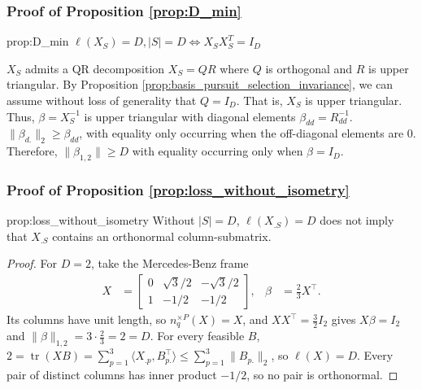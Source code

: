 \subsubsection{Proof of Proposition \ref{prop:D_min}}

\begin{restatedproposition}{prop:D_min}
$\ell (X_S) = D , |S| = D \Leftrightarrow X_S X_S^T = I_D$
\end{restatedproposition}

$X_S$ admits a QR decomposition $X_S = QR$ where $Q$ is orthogonal and $R$ is upper triangular.
By Proposition \ref{prop:basis_pursuit_selection_invariance}, we can assume without loss of generality that $Q = I_D$.
That is, $X_S$ is upper triangular.
Thus, $\beta = X_S^{-1}$ is upper triangular with diagonal elements $\beta_{dd} = R_{dd}^{-1}$.
$\|\beta_{d.}\|_2 \geq \beta_{dd}$, with equality only occurring when the off-diagonal elements are $0$.
Therefore, $\|\beta_{1,2}\| \geq D$ with equality occurring only when $\beta = I_D$.

\subsubsection{Proof of Proposition \ref{prop:loss_without_isometry}}

\begin{restatedproposition}{prop:loss_without_isometry}
Without $|S|=D$, $\ell(X_{.S})=D$ does not imply that $X_{.S}$ contains an orthonormal column-submatrix.
\end{restatedproposition}

\begin{proof}
For $D=2$, take the Mercedes-Benz frame
\begin{align}
X&=\begin{bmatrix}
0&\sqrt3/2&-\sqrt3/2\\
1&-1/2&-1/2
\end{bmatrix}, &
\beta&=\frac23 X^\top.
\end{align}
Its columns have unit length, so $n_q^{\times P}(X)=X$, and $XX^\top=\frac32 I_2$ gives $X\beta=I_2$ and $\|\beta\|_{1,2}=3\cdot\frac23=2=D$.
For every feasible $B$, $2=\operatorname{tr}(XB)=\sum_{p=1}^3\langle X_{.p},B_{p.}^\top\rangle \leq\sum_{p=1}^3\|B_{p.}\|_2$, so $\ell(X)=D$.
Every pair of distinct columns has inner product $-1/2$, so no pair is orthonormal.
\end{proof}

